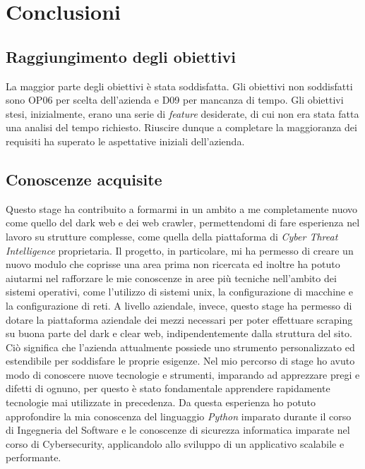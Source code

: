 

\chapter{Conclusioni}
\label{cap:conclusioni}

\section{Raggiungimento degli obiettivi}
La maggior parte degli obiettivi è stata soddisfatta. Gli obiettivi non soddisfatti sono OP06 per scelta dell'azienda e D09 per mancanza di tempo. Gli obiettivi stesi, inizialmente, erano una serie di \emph{feature} desiderate, di cui non era stata fatta una analisi del tempo richiesto. Riuscire dunque a completare la maggioranza dei requisiti ha superato le aspettative iniziali dell'azienda.

\section{Conoscenze acquisite}
Questo stage ha contribuito a formarmi in un ambito a me completamente nuovo come quello del dark web e dei web crawler, permettendomi di fare esperienza nel lavoro su strutture complesse, come quella della piattaforma di \emph{Cyber Threat Intelligence} proprietaria. Il progetto, in particolare, mi ha permesso di creare un nuovo modulo che coprisse una area prima non ricercata ed inoltre ha potuto aiutarmi nel rafforzare le mie conoscenze in aree più tecniche nell'ambito dei sistemi operativi, come l'utilizzo di sistemi unix, la configurazione di macchine e la configurazione di reti. A livello aziendale, invece, questo stage ha permesso di dotare la piattaforma aziendale dei mezzi necessari per poter effettuare scraping su buona parte del dark e clear web, indipendentemente dalla struttura del sito. Ciò significa che l’azienda attualmente possiede uno strumento personalizzato ed estendibile per soddisfare le proprie esigenze. \newline{}
Nel mio percorso di stage ho avuto modo di conoscere nuove tecnologie e strumenti, imparando ad apprezzare pregi e difetti di ognuno, per questo è stato fondamentale apprendere rapidamente tecnologie mai utilizzate in precedenza.
Da questa esperienza ho potuto approfondire la mia conoscenza del linguaggio \emph{Python} imparato durante il corso di Ingegneria del Software e le conoscenze di sicurezza informatica imparate nel corso di Cybersecurity, applicandolo allo sviluppo di un applicativo scalabile e performante.
\newpage
